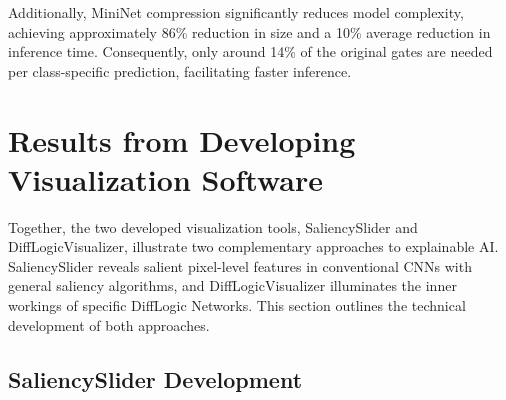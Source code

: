 Additionally, MiniNet compression significantly reduces model complexity, achieving approximately 86\% reduction in size and a 10\% average reduction in inference time. Consequently, only around 14\% of the original gates are needed per class-specific prediction, facilitating faster inference.













\section{Results from Developing Visualization Software}
\label{sec:results_visualization}

Together, the two developed visualization tools, SaliencySlider and DiffLogicVisualizer, illustrate two complementary approaches to explainable AI. SaliencySlider reveals salient pixel-level features in conventional CNNs with general saliency algorithms, and DiffLogicVisualizer illuminates the inner workings of specific DiffLogic Networks. This section outlines the technical development of both approaches.

\subsection{SaliencySlider Development}
\label{sec:saliencySlider_results}

